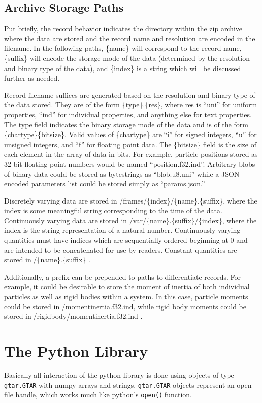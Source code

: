 \documentclass{article}
\begin{document}
\subsection{Archive Storage Paths}
Put briefly, the record behavior indicates the directory within the zip archive where the data are stored and the record name and resolution are encoded in the filename.
In the following paths, \{name\} will correspond to the record name, \{suffix\} will encode the storage mode of the data (determined by the resolution and binary type of the data), and \{index\} is a string which will be discussed further as needed.

Record filename suffices are generated based on the resolution and binary type of the data stored.
They are of the form \{type\}.\{res\}, where res is ``uni'' for uniform properties, ``ind'' for individual properties, and anything else for text properties.
The type field indicates the binary storage mode of the data and is of the form \{chartype\}\{bitsize\}.
Valid values of \{chartype\} are ``i'' for signed integers, ``u'' for unsigned integers, and ``f'' for floating point data.
The \{bitsize\} field is the size of each element in the array of data in bits.
For example, particle positions stored as 32-bit floating point numbers would be named ``position.f32.ind''.
Arbitrary blobs of binary data could be stored as bytestrings as ``blob.u8.uni'' while a JSON-encoded parameters list could be stored simply as ``params.json.''

Discretely varying data are stored in /frames/\{index\}/\{name\}.\{suffix\}, where the index is some meaningful string corresponding to the time of the data.
Continuously varying data are stored in /var/\{name\}.\{suffix\}/\{index\}, where the index is the string representation of a natural number.
Continuously varying quantities must have indices which are sequentially ordered beginning at 0 and are intended to be concatenated for use by readers.
Constant quantities are stored in /\{name\}.\{suffix\} .

Additionally, a prefix can be prepended to paths to differentiate records.
For example, it could be desirable to store the moment of inertia of both individual particles as well as rigid bodies within a system.
In this case, particle moments could be stored in /moment\textunderscore inertia.f32.ind, while rigid body moments could be stored in /rigid\textunderscore body/moment\textunderscore inertia.f32.ind .

\section{The Python Library}
Basically all interaction of the python library is done using objects of type \texttt{gtar.GTAR} with numpy arrays and strings.
\texttt{gtar.GTAR} objects represent an open file handle, which works much like python's \texttt{open()} function.
\end{document}
